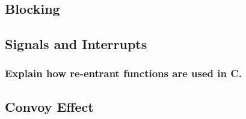 \documentclass[11pt]{article}
\begin{document}
\subsection{Blocking}
\label{sec-7.5}

\subsection{Signals and Interrupts}
\label{sec-7.6}

\subsubsection{Explain how re-entrant functions are used in C.}
\label{sec-7.6.1}

\subsection{Convoy Effect}
\label{sec-7.7}
\end{document}
